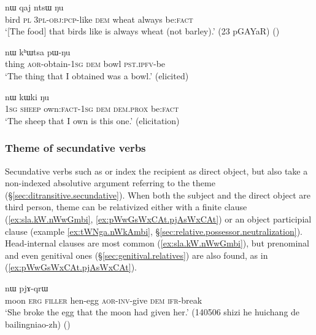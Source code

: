   \begin{exe}
\ex \label{ex:pGa.ra.nWkArga}
 nɯ qaj ntsɯ ŋu   \\
bird \textsc{pl} \textsc{3pl}-\textsc{obj}:\textsc{pcp}-like \textsc{dem} wheat always be:\textsc{fact} \\
  \glt `[The food] that birds like is always wheat (not barley).' (23 pGAYaR)
()
   \end{exe} 
   
  \begin{exe}
\ex \label{ex:pWBJata.nW}
 nɯ kʰɯtsa pɯ-ŋu \\
thing \textsc{aor}-obtain-\textsc{1sg} \textsc{dem} bowl \textsc{pst}.\textsc{ipfv}-be \\
\glt `The thing that I obtained was a bowl.' (elicited)
   \end{exe} 
   
  \begin{exe}
\ex \label{ex:aroa.nW}
 nɯ kɯki ŋu  \\
\textsc{1sg} \textsc{sheep} own:\textsc{fact}-\textsc{1sg} \textsc{dem} \textsc{dem}.\textsc{prox} be:\textsc{fact} \\
  \glt `The sheep that I own is this one.' (elicitation)
   \end{exe} 
   
 \subsubsection{Theme of secundative verbs}  \label{sec:secundative.theme.relativization}
Secundative verbs such as  or  index the recipient as direct object, but also take a non-indexed absolutive argument referring to the theme (§\ref{sec:ditransitive.secundative}). When both the subject and the direct object are third person, theme can be relativized either with a finite clause (\ref{ex:sla.kW.nWwGmbi}, \ref{ex:pWwGsWxCAt.pjAsWxCAt}) or an object participial clause (example \ref{ex:tWNga.nWkAmbi}, §\ref{sec:relative.possessor.neutralization}).  Head-internal clauses are most common (\ref{ex:sla.kW.nWwGmbi}), but prenominal and even genitival ones (§\ref{sec:genitival.relatives}) are also found, as in (\ref{ex:pWwGsWxCAt.pjAsWxCAt}).
 
\begin{exe}
\ex \label{ex:sla.kW.nWwGmbi}
 nɯ pjɤ-qrɯ \\
moon \textsc{erg} \textsc{filler} hen-egg \textsc{aor}-\textsc{inv}-give \textsc{dem} \textsc{ifr}-break \\
\glt `She broke the egg that the moon had given her.' (140506 shizi he huichang de bailingniao-zh)
()
\end{exe} 
 
